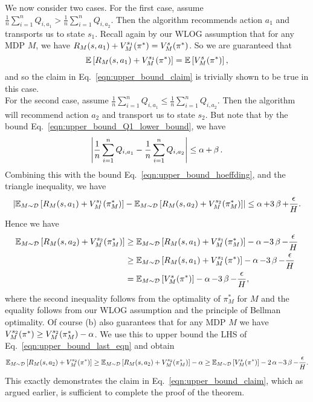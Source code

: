 \documentclass[11pt,twoside]{article}
\begin{document}
\noindent We now consider two cases. For the first case, assume $\frac{1}{n} \sum_{i=1}^n Q_{i,a_1} > \frac{1}{n} \sum_{i=1}^n Q_{i,a_2}$. Then the algorithm recommends action $a_1$ and transports us to state $s_1$. Recall again by our WLOG assumption that for any MDP $M$, we have $R_M(s, a_1) + V^{{s_1 }}_{{M }}({\pi^*}) = V^{{s }}_{{M }}({\pi^*})$. So we are guaranteed that
$$
\operatorname{\mathbb{E}} \left[ R_M(s, a_1) + V^{{s_1 }}_{{M }}({\pi^*}) \right] = \operatorname{\mathbb{E}} \left[ V^{{s }}_{{M }}({\pi^*}) \right],
$$
and so the claim in Eq.~\eqref{eqn:upper_bound_claim} is trivially shown to be true in this case. \\

\noindent For the second case, assume $\frac{1}{n} \sum_{i=1}^n Q_{i,a_1} \leq \frac{1}{n} \sum_{i=1}^n Q_{i,a_2}$. Then the algorithm will recommend action $a_2$ and transport us to state $s_2$. But note that by the bound Eq.~\eqref{eqn:upper_bound_Q1_lower_bound}, we have
$$
\left \vert \frac{1}{n} \sum_{i=1}^n Q_{i,a_1} - \frac{1}{n} \sum_{i=1}^n Q_{i,a_2} \right \vert \leq \operatorname{\alpha} + \operatorname{\beta}.
$$
Combining this with the bound Eq.~\eqref{eqn:upper_bound_hoeffding}, and the triangle inequality, we have
$$
\left \vert \operatorname{\mathbb{E}}_{M \sim \mathcal{D}} \left[ R_M(s, a_1) + V^{{s_1 }}_{{M }}({\pi^*_M}) \right] - \operatorname{\mathbb{E}}_{M \sim \mathcal{D}} \left[ R_M(s, a_2) + V^{{s_2 }}_{{M }}({\pi^*_M}) \right] \right \vert \leq \operatorname{\alpha} + 3\operatorname{\beta} + \frac{\epsilon}{H}.
$$
Hence we have
\begin{align}
\label{eqn:upper_bound_last_eqn}
\begin{split}
\operatorname{\mathbb{E}}_{M \sim \mathcal{D}} \left[ R_M(s, a_2) + V^{{s_2 }}_{{M }}({\pi^*_M}) \right] &\geq \operatorname{\mathbb{E}}_{M \sim \mathcal{D}} \left[ R_M(s, a_1) + V^{{s_1 }}_{{M }}({\pi^*_M}) \right] - \operatorname{\alpha} - 3 \operatorname{\beta} - \frac{\epsilon}{H} \\
&\geq \operatorname{\mathbb{E}}_{M \sim \mathcal{D}} \left[ R_M(s, a_1) + V^{{s_1 }}_{{M }}({\pi^*}) \right] - \operatorname{\alpha} - 3 \operatorname{\beta} - \frac{\epsilon}{H} \\
&= \operatorname{\mathbb{E}}_{M \sim \mathcal{D}} \left[ V^{{s }}_{{M }}({\pi^*}) \right] - \operatorname{\alpha} - 3 \operatorname{\beta} - \frac{\epsilon}{H},
\end{split}
\end{align}
where the second inequality follows from the optimality of $\pi^*_M$ for $M$ and the equality follows from our WLOG assumption and the principle of Bellman optimality. Of course \strprox{} (b) also guarantees that for any MDP $M$ we have $V^{{s_2 }}_{{M }}({\pi^*}) \geq V^{{s_2 }}_{{M }}({\pi^*_M}) - \operatorname{\alpha}$. We use this to upper bound the LHS of Eq.~\eqref{eqn:upper_bound_last_eqn} and obtain
$$
\operatorname{\mathbb{E}}_{M \sim \mathcal{D}} \left[ R_M(s, a_2) + V^{{s_2 }}_{{M }}({\pi^*}) \right] \geq \operatorname{\mathbb{E}}_{M \sim \mathcal{D}} \left[ R_M(s, a_2) + V^{{s_2 }}_{{M }}({\pi^*_M}) \right] - \operatorname{\alpha} \geq \operatorname{\mathbb{E}}_{M \sim \mathcal{D}} \left[ V^{{s }}_{{M }}({\pi^*}) \right] - 2\operatorname{\alpha} - 3 \operatorname{\beta} - \frac{\epsilon}{H}.
$$
This exactly demonstrates the claim in Eq.~\eqref{eqn:upper_bound_claim}, which as argued earlier, is sufficient to complete the proof of the theorem.
\end{document}
